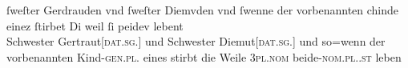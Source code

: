 \begin{exe}
\ex \label{ex:cao_beidiu_neutfem}


		\gll ſweſter Gerdrauden vnd ſweſter Diemvden
				\textelp{} vnd ſwenne der vorbenannten chinde einez ſtirbet
				\textelp{} Di weil ſi peidev lebent
				\\
			Schwester Gertraut[\textsc{dat.sg.\FemF}] und Schwester
				Diemut[\textsc{dat.sg.\FemF}]
				{} und so=wenn der vorbenannten Kind-\textsc{gen.pl.\NeutF}
				eines stirbt {} 
				die Weile \textsc{3pl\subF.nom}
				beide-\textsc{nom.pl.\NeutF.st} leben
				\\
		\trans {}
			\parencites(Nr.~2960, Engelthal, Kr.~Nürnberger Land, 1298)[240,31--38]{cao4}
\end{exe}

